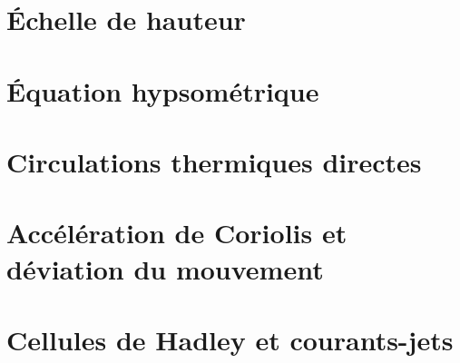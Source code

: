 \documentclass[a4paper,DIV16,10pt]{scrartcl}
\begin{document}
%

%

%

\newpage
\section{\'Echelle de hauteur}

\section{\'Equation hypsométrique}


\newpage
\section{Circulations thermiques directes}



\newpage
\section{Accélération de Coriolis et déviation du mouvement}


\newpage
\section{Cellules de Hadley et courants-jets}

\end{document}
